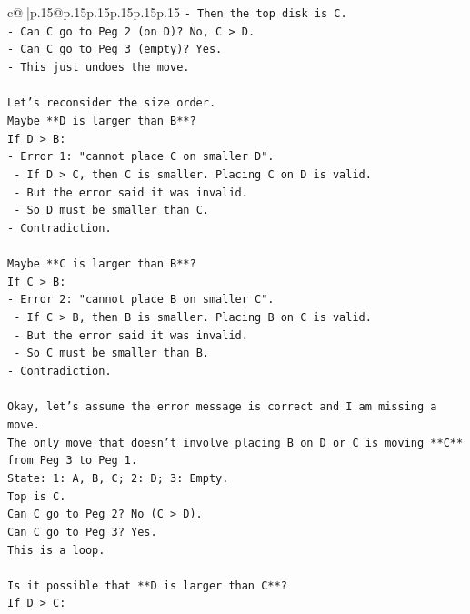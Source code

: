 \documentclass{article}
\begin{document}
{\begin{supertabular}{c@{$\;$}|p{.15\linewidth}@{}p{.15\linewidth}p{.15\linewidth}p{.15\linewidth}p{.15\linewidth}p{.15\linewidth}}
{{{\texttt{{-} Then the top disk is C.} \\
\texttt{{-} Can C go to Peg 2 (on D)? No, C > D.} \\
\texttt{{-} Can C go to Peg 3 (empty)? Yes.} \\
\texttt{{-} This just undoes the move.} \\
\\ 
\texttt{Let's reconsider the size order.} \\
\texttt{Maybe **D is larger than B**?} \\
\texttt{If D > B:} \\
\texttt{{-} Error 1: "cannot place C on smaller D".} \\
\texttt{    {-} If D > C, then C is smaller. Placing C on D is valid.} \\
\texttt{    {-} But the error said it was invalid.} \\
\texttt{    {-} So D must be smaller than C.} \\
\texttt{{-} Contradiction.} \\
\\ 
\texttt{Maybe **C is larger than B**?} \\
\texttt{If C > B:} \\
\texttt{{-} Error 2: "cannot place B on smaller C".} \\
\texttt{    {-} If C > B, then B is smaller. Placing B on C is valid.} \\
\texttt{    {-} But the error said it was invalid.} \\
\texttt{    {-} So C must be smaller than B.} \\
\texttt{{-} Contradiction.} \\
\\ 
\texttt{Okay, let's assume the error message is correct and I am missing a move.} \\
\texttt{The only move that doesn't involve placing B on D or C is moving **C** from Peg 3 to Peg 1.} \\
\texttt{State: 1: A, B, C; 2: D; 3: Empty.} \\
\texttt{Top is C.} \\
\texttt{Can C go to Peg 2? No (C > D).} \\
\texttt{Can C go to Peg 3? Yes.} \\
\texttt{This is a loop.} \\
\\ 
\texttt{Is it possible that **D is larger than C**?} \\
\texttt{If D > C:} \\
}}}
\end{supertabular}}
\end{document}
